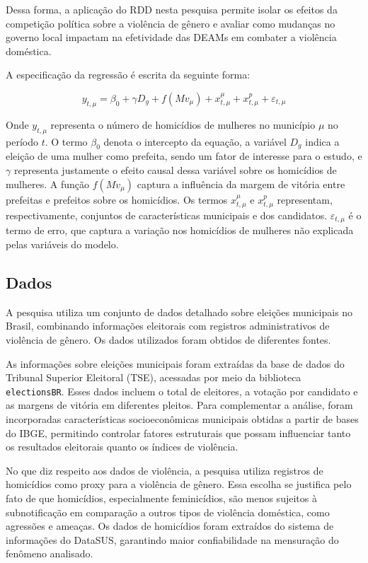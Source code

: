 Dessa forma, a aplicação do RDD nesta pesquisa permite isolar os efeitos da competição política sobre a violência de gênero e avaliar como mudanças no governo local impactam na efetividade das DEAMs em combater a violência doméstica.

A especificação da regressão é escrita da seguinte forma:

\begin{equation}
    y_{t,\mu} =  \beta_0 + \gamma D_g + f(Mv_\mu) + x^\mu_{t,\mu} +  x^p_{t,\mu} + \varepsilon_{t,\mu}
\end{equation}

Onde \(y_{t,\mu}\) representa o número de homicídios de mulheres no município \(\mu\) no período \(t\). O termo \(\beta_0\) denota o intercepto da equação, a variável \(D_g\) indica a eleição de uma mulher como prefeita, sendo um fator de interesse para o estudo, e \(\gamma\) representa justamente o efeito causal dessa variável sobre os homicídios de mulheres. A função \(f(Mv_\mu)\) captura a influência da margem de vitória entre prefeitas e prefeitos sobre os homicídios. Os termos \(x^\mu_{t,\mu}\) e \(x^p_{t,\mu}\) representam, respectivamente, conjuntos de características municipais e dos candidatos. \(\varepsilon_{t,\mu}\) é o termo de erro, que captura a variação nos homicídios de mulheres não explicada pelas variáveis do modelo.


\subsection{Dados}
\label{dados}

A pesquisa utiliza um conjunto de dados detalhado sobre eleições municipais no Brasil, combinando informações eleitorais com registros administrativos de violência de gênero. Os dados utilizados foram obtidos de diferentes fontes. 

As informações sobre eleições municipais foram extraídas da base de dados do Tribunal Superior Eleitoral (TSE), acessadas por meio da biblioteca \texttt{electionsBR}. Esses dados incluem o total de eleitores, a votação por candidato e as margens de vitória em diferentes pleitos. Para complementar a análise, foram incorporadas características socioeconômicas municipais obtidas a partir de bases do IBGE, permitindo controlar fatores estruturais que possam influenciar tanto os resultados eleitorais quanto os índices de violência. 

No que diz respeito aos dados de violência, a pesquisa utiliza registros de homicídios como proxy para a violência de gênero. Essa escolha se justifica pelo fato de que homicídios, especialmente feminicídios, são menos sujeitos à subnotificação em comparação a outros tipos de violência doméstica, como agressões e ameaças. Os dados de homicídios foram extraídos do sistema de informações do DataSUS, garantindo maior confiabilidade na mensuração do fenômeno analisado. 

